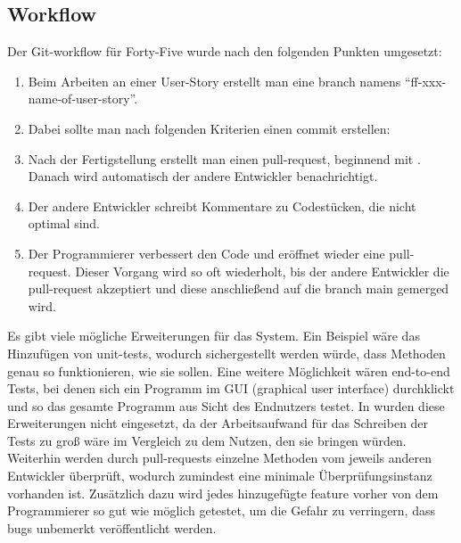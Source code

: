 \renewcommand{\kapitelautor}{Autor: Felix Zwickelstorfer}
\subsection{Workflow}\label{subsec:workflow}

Der Git-workflow für Forty-Five wurde nach den folgenden Punkten umgesetzt:
\begin{enumerate}
    \item Beim Arbeiten an einer User-Story erstellt man eine branch namens ``ff-xxx-name-of-user-story''.
    \item Dabei sollte man nach folgenden Kriterien einen commit erstellen:
    \item Nach der Fertigstellung erstellt man einen pull-request, beginnend mit \quoted{[ff-xxx]}.
    Danach wird automatisch der andere Entwickler benachrichtigt.
    \item Der andere Entwickler schreibt Kommentare zu Codestücken, die nicht optimal sind.
    \item Der Programmierer verbessert den Code und eröffnet wieder eine pull-request.
    Dieser Vorgang wird so oft wiederholt, bis der andere Entwickler die pull-request akzeptiert und diese anschließend auf die branch main gemerged wird.
\end{enumerate}

Es gibt viele mögliche Erweiterungen für das System.
Ein Beispiel wäre das Hinzufügen von unit-tests, wodurch sichergestellt werden würde, dass Methoden genau so funktionieren, wie sie sollen.
Eine weitere Möglichkeit wären end-to-end Tests, bei denen sich ein Programm im GUI (graphical user interface) durchklickt und so das gesamte Programm aus Sicht des Endnutzers testet.
In \FF wurden diese Erweiterungen nicht eingesetzt, da der Arbeitsaufwand für das Schreiben der Tests zu groß wäre im Vergleich zu dem Nutzen, den sie bringen würden.
Weiterhin werden durch pull-requests einzelne Methoden vom jeweils anderen Entwickler überprüft, wodurch zumindest eine minimale Überprüfungsinstanz vorhanden ist.
Zusätzlich dazu wird jedes hinzugefügte feature vorher von dem Programmierer so gut wie möglich getestet, um die Gefahr zu verringern, dass bugs unbemerkt veröffentlicht werden.
